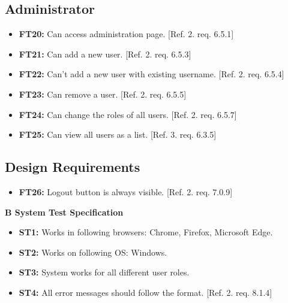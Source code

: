 \documentclass{article}
\begin{document}
		\subsection{Administrator}
		
			\begin{itemize}
			
			\item \textbf{FT20:} Can access administration page. [Ref. 2. req. 6.5.1]			
			
  			\item \textbf{FT21:} Can add a new user. [Ref. 2. req. 6.5.3]
  			
  			\item \textbf{FT22:} Can't add a new user with existing username. [Ref. 2. req. 6.5.4]

  			\item \textbf{FT23:} Can remove a user. [Ref. 2. req. 6.5.5]
  			
  			\item \textbf{FT24:} Can change the roles of all users. [Ref. 2. req. 6.5.7]
  			
  			\item \textbf{FT25:} Can view all users as a list. [Ref. 3. req. 6.3.5]

		\end{itemize}
		
		\subsection{Design Requirements}
		
		\begin{itemize}
  			
  			\item \textbf{FT26:} Logout button is always visible. [Ref. 2. req. 7.0.9]

		\end{itemize}
		
		\newpage
		\begin{flushleft}
		{\large \textbf{B System Test Specification}}
		\end{flushleft}
		
		
		
		\begin{itemize}
		
  			\item \textbf{ST1:} Works in following browsers: Chrome, Firefox, Microsoft Edge.  
  			
  			\item \textbf{ST2:} Works on following OS: Windows.	 			
  			
  			\item \textbf{ST3:} System works for all different user roles. 
  			
  			\item \textbf{ST4:} All error messages should follow the format. [Ref. 2. req. 8.1.4]

  			
		\end{itemize}
		
\end{document}
